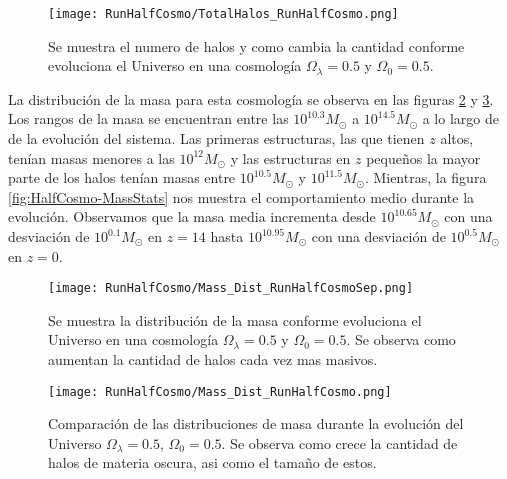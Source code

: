 \begin{figure}[H]
    \centering
    \texttt{[image: RunHalfCosmo/TotalHalos\_RunHalfCosmo.png]}
    \caption[Evolución del número de halos en un Universo $\Omega_\lambda = 0.5 $, $\Omega_0 = 0.5$]{\footnotesize Se muestra el numero de halos y como cambia la cantidad conforme evoluciona el Universo en una cosmología $\Omega_\lambda = 0.5 $ y $\Omega_0 = 0.5$.}    
    \label{fig:HalfCosmo-TotalHalos}
\end{figure}

La distribución de la masa para esta cosmología se observa en las figuras \ref{fig:HalfCosmo-MassDistSep} y \ref{fig:HalfCosmo-MassDist}. Los rangos de la masa se encuentran entre las $10^{10.3}M_\odot$ a $10^{14.5}M_\odot$ a lo largo de de la evolución del sistema. Las primeras estructuras, las que tienen $z$ altos, tenían masas menores a las $10^{12}M_\odot$ y las estructuras en $z$ pequeños la mayor parte de los halos tenían masas entre $10^{10.5}M_\odot$ y $10^{11.5}M_\odot$. Mientras, la figura \ref{fig:HalfCosmo-MassStats} nos muestra el comportamiento medio durante la evolución. Observamos que la masa media incrementa desde $10^{10.65}M_\odot$ con una desviación de $10^{0.1}M_\odot$ en $z=14$ hasta $10^{10.95}M_\odot$ con una desviación de $10^{0.5}M_\odot$ en $z=0$.

\begin{figure}[H]
    \centering
    \texttt{[image: RunHalfCosmo/Mass\_Dist\_RunHalfCosmoSep.png]}
    \caption[Distribución de masa en la evolución de un Universo $\Omega_\lambda = 0.5$, $\Omega_0 = 0.5$]{\footnotesize Se muestra la distribución de la masa conforme evoluciona el Universo en una cosmología $\Omega_\lambda = 0.5$ y $\Omega_0 = 0.5$. Se observa como aumentan la cantidad de halos cada vez mas masivos.}
    \label{fig:HalfCosmo-MassDistSep}
\end{figure}

\begin{figure}[H]
    \centering
    \texttt{[image: RunHalfCosmo/Mass\_Dist\_RunHalfCosmo.png]}
    \caption[Comparación de distribución de masa Universo $\Omega_\lambda = 0.5$, $\Omega_0 = 0.5$]{\footnotesize Comparación de las distribuciones de masa durante la evolución del Universo $\Omega_\lambda = 0.5$, $\Omega_0 = 0.5$. Se observa como crece la cantidad de halos de materia oscura, asi como el tamaño de estos.}
    \label{fig:HalfCosmo-MassDist}
\end{figure}

